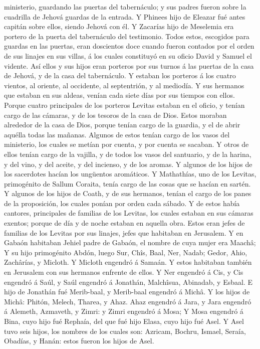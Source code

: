 ministerio, guardando las puertas del tabernáculo; y sus padres fueron
sobre la cuadrilla de Jehová guardas de la entrada.  Y
Phinees hijo de Eleazar fué antes capitán sobre ellos, siendo Jehová con
él.  Y Zacarías hijo de Meselemia era portero de la puerta
del tabernáculo del testimonio.  Todos estos, escogidos
para guardas en las puertas, eran doscientos doce cuando fueron contados
por el orden de sus linajes en sus villas, á los cuales constituyó en su
oficio David y Samuel el vidente.  Así ellos y sus hijos
eran porteros por sus turnos á las puertas de la casa de Jehová, y de la
casa del tabernáculo.  Y estaban los porteros á los cuatro
vientos, al oriente, al occidente, al septentrión, y al mediodía.
 Y sus hermanos que estaban en sus aldeas, venían cada
siete días por sus tiempos con ellos.  Porque cuatro
principales de los porteros Levitas estaban en el oficio, y tenían cargo
de las cámaras, y de los tesoros de la casa de Dios.  Estos
moraban alrededor de la casa de Dios, porque tenían cargo de la guardia,
y el de abrir aquélla todas las mañanas.  Algunos de estos
tenían cargo de los vasos del ministerio, los cuales se metían por
cuenta, y por cuenta se sacaban.  Y otros de ellos tenían
cargo de la vajilla, y de todos los vasos del santuario, y de la harina,
y del vino, y del aceite, y del incienso, y de los aromas. 
Y algunos de los hijos de los sacerdotes hacían los ungüentos
aromáticos.  Y Mathathías, uno de los Levitas, primogénito
de Sallum Coraita, tenía cargo de las cosas que se hacían en sartén.
 Y algunos de los hijos de Coath, y de sus hermanos, tenían
el cargo de los panes de la proposición, los cuales ponían por orden
cada sábado.  Y de estos había cantores, principales de
familias de los Levitas, los cuales estaban en sus cámaras exentos;
porque de día y de noche estaban en aquella obra.  Estos
eran jefes de familias de los Levitas por sus linajes, jefes que
habitaban en Jerusalem.  Y en Gabaón habitaban Jehiel padre
de Gabaón, el nombre de cuya mujer era Maachâ;  Y su hijo
primogénito Abdón, luego Sur, Chîs, Baal, Ner, Nadab; 
Gedor, Ahio, Zachârías, y Micloth.  Y Micloth engendró á
Samaán. Y estos habitaban también en Jerusalem con sus hermanos enfrente
de ellos.  Y Ner engendró á Cis, y Cis engendró á Saúl, y
Saúl engendró á Jonathán, Malchîsua, Abinadab, y Esbaal.  E
hijo de Jonathán fué Merib-baal, y Merib-baal engendró á Michâ.
 Y los hijos de Michâ: Phitón, Melech, Tharea, y Ahaz.
 Ahaz engendró á Jara, y Jara engendró á Alemeth, Azmaveth,
y Zimri: y Zimri engendró á Mosa;  Y Mosa engendró á Bina,
cuyo hijo fué Rephaía, del que fué hijo Elasa, cuyo hijo fué Asel.
 Y Asel tuvo seis hijos, los nombres de los cuales son:
Azricam, Bochru, Ismael, Seraía, Obadías, y Hanán: estos fueron los
hijos de Asel.

